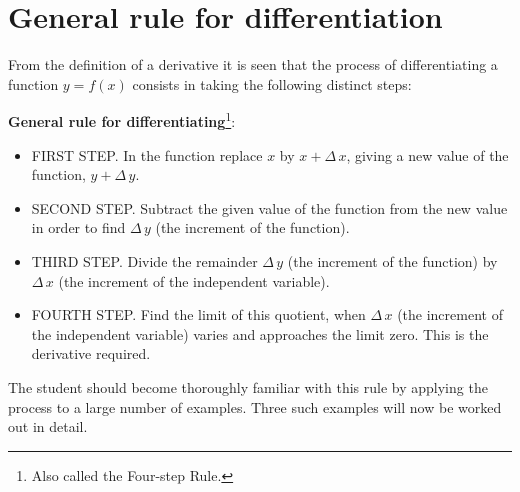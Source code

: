 \section{General rule for differentiation}
\label{sec:31}

From the definition of a derivative it is seen that the process of 
differentiating a function $y = f(x)$ consists in taking the following 
distinct steps:


{\bf General rule for differentiating}\footnote{Also called the 
Four-step Rule.}:

\begin{itemize}

\item
FIRST STEP. In the function replace $x$ by $x + \Delta\, x$, giving a new 
value of the function, $y + \Delta\, y$.

\item
SECOND STEP. Subtract the given value of the function from the new value 
in order to find $\Delta\, y$ (the increment of the function).

\item
THIRD STEP. Divide the remainder $\Delta\, y$ (the increment of the 
function) by $\Delta\, x$ (the increment of the independent variable).

\item
FOURTH STEP. Find the limit of this quotient, when $\Delta\, x$ 
(the increment of the independent variable) varies and approaches the 
limit zero. This is the derivative required.
\end{itemize}

The student should become thoroughly familiar with this rule by applying 
the process to a large number of examples. Three such examples will now be 
worked out in detail.


